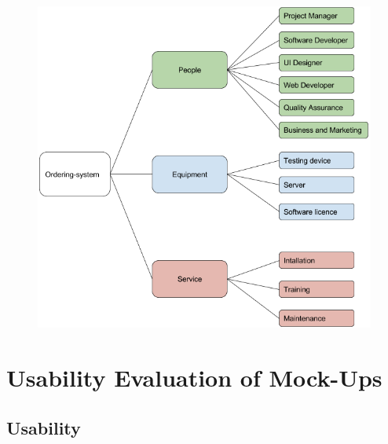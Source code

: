 \documentclass[11pt, a4paper]{report}
\begin{document}
\begin{figure}
\centering
\includegraphics[scale=0.8]{Figures/CostingBreakdown.png}
\end{figure}




\chapter{Usability Evaluation of Mock-Ups}
\pagebreak
\minitoc
\pagebreak
\section{Usability} 
\end{document}
